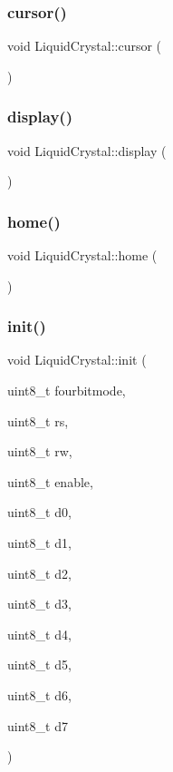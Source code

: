 \subsubsection{\texorpdfstring{cursor()}{cursor()}}
{\footnotesize\ttfamily void Liquid\+Crystal\+::cursor (\begin{DoxyParamCaption}{ }\end{DoxyParamCaption})}

\mbox{\label{class_liquid_crystal_a81bb76db1b82a8e55a07de6cb0a262b2}} 
\subsubsection{\texorpdfstring{display()}{display()}}
{\footnotesize\ttfamily void Liquid\+Crystal\+::display (\begin{DoxyParamCaption}{ }\end{DoxyParamCaption})}

\mbox{\label{class_liquid_crystal_aeabdf852b59e8155ef7df8db008c8d55}} 
\subsubsection{\texorpdfstring{home()}{home()}}
{\footnotesize\ttfamily void Liquid\+Crystal\+::home (\begin{DoxyParamCaption}{ }\end{DoxyParamCaption})}

\mbox{\label{class_liquid_crystal_ae45eec827b26174f73e9cf3ddda635af}} 
\subsubsection{\texorpdfstring{init()}{init()}}
{\footnotesize\ttfamily void Liquid\+Crystal\+::init (\begin{DoxyParamCaption}\item[{uint8\+\_\+t}]{fourbitmode,  }\item[{uint8\+\_\+t}]{rs,  }\item[{uint8\+\_\+t}]{rw,  }\item[{uint8\+\_\+t}]{enable,  }\item[{uint8\+\_\+t}]{d0,  }\item[{uint8\+\_\+t}]{d1,  }\item[{uint8\+\_\+t}]{d2,  }\item[{uint8\+\_\+t}]{d3,  }\item[{uint8\+\_\+t}]{d4,  }\item[{uint8\+\_\+t}]{d5,  }\item[{uint8\+\_\+t}]{d6,  }\item[{uint8\+\_\+t}]{d7 }\end{DoxyParamCaption})}

